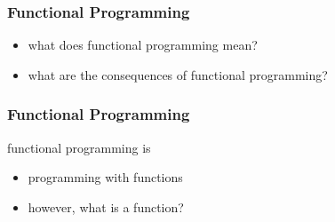 \begin{frame}
\frametitle{Functional Programming}

\begin{itemize}
  \item<1> what does functional programming mean?
  \item<2> what are the consequences of functional programming?
\end{itemize}
\end{frame}

\begin{frame}
\frametitle{Functional Programming}
\begin{block}{functional programming is}
\begin{itemize}
  \item programming with functions
  \item however, what is a function?
\end{itemize}
\end{block}
\end{frame}
